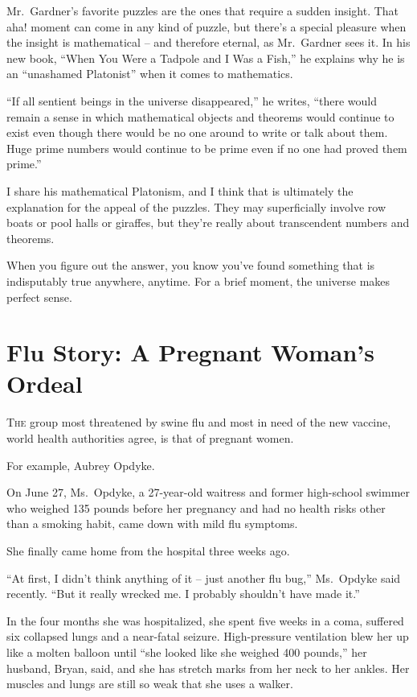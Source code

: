 ﻿\documentclass[12pt]{article}
\begin{document}
Mr.~Gardner's favorite puzzles are the ones that require a sudden insight. That aha! moment can come
in any kind of puzzle, but there's a special pleasure when the insight is mathematical -- and
therefore eternal, as Mr.~Gardner sees it. In his new book, ``When You Were a Tadpole and I Was a
Fish,'' he explains why he is an ``unashamed Platonist'' when it comes to mathematics.

``If all sentient beings in the universe disappeared,'' he writes, ``there would remain a sense in
which mathematical objects and theorems would continue to exist even though there would be no one
around to write or talk about them. Huge prime numbers would continue to be prime even if no one had
proved them prime.''

I share his mathematical Platonism, and I think that is ultimately the explanation for the appeal of
the puzzles. They may superficially involve row boats or pool halls or giraffes, but they're really
about transcendent numbers and theorems.

When you figure out the answer, you know you've found something that is indisputably true anywhere,
anytime. For a brief moment, the universe makes perfect sense.

\section{Flu Story: A Pregnant Woman's Ordeal}

\lettrine{T}{he} group most threatened by swine flu
and most in need of the new vaccine, world health authorities agree, is that of pregnant women.

For example, Aubrey Opdyke.

On June 27, Ms.~Opdyke, a 27-year-old waitress and former high-school swimmer who weighed 135 pounds
before her pregnancy and had no health risks other than a smoking habit, came down with mild flu
symptoms.

She finally came home from the hospital three weeks ago.

``At first, I didn't think anything of it -- just another flu bug,'' Ms.~Opdyke said recently. ``But
it really wrecked me. I probably shouldn't have made it.''

In the four months she was hospitalized, she spent five weeks in a coma, suffered six collapsed
lungs and a near-fatal seizure. High-pressure ventilation blew her up like a molten balloon until
``she looked like she weighed 400 pounds,'' her husband, Bryan, said, and she has stretch marks from
her neck to her ankles. Her muscles and lungs are still so weak that she uses a walker.
\end{document}
